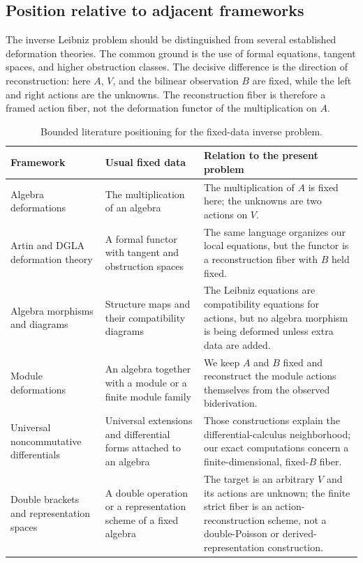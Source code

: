 \documentclass[11pt]{amsart}
\begin{document}
\subsection{Position relative to adjacent frameworks}\label{sec:literature-position}
The inverse Leibniz problem should be distinguished from several established deformation theories.  The common ground is the use of formal equations, tangent spaces, and higher obstruction classes.  The decisive difference is the direction of reconstruction: here $A$, $V$, and the bilinear observation $B$ are fixed, while the left and right actions are the unknowns.  The reconstruction fiber is therefore a framed action fiber, not the deformation functor of the multiplication on $A$.

\begin{table}[ht]
\centering
\small
\caption{Bounded literature positioning for the fixed-data inverse problem.}
\label{tab:framework-comparison}
\begin{tabular}{@{}p{}p{}p{}@{}}
\toprule
Framework & Usual fixed data & Relation to the present problem \\
\midrule
Algebra deformations \cite{Gerstenhaber1964} & The multiplication of an algebra & The multiplication of $A$ is fixed here; the unknowns are two actions on $V$. \\
Artin and DGLA deformation theory \cite{Schlessinger1968,GerstenhaberSchack1988} & A formal functor with tangent and obstruction spaces & The same language organizes our local equations, but the functor is a reconstruction fiber with $B$ held fixed. \\
Algebra morphisms and diagrams \cite{GerstenhaberSchack1983,GerstenhaberSchack1985} & Structure maps and their compatibility diagrams & The Leibniz equations are compatibility equations for actions, but no algebra morphism is being deformed unless extra data are added. \\
Module deformations \cite{Laudal2002} & An algebra together with a module or a finite module family & We keep $A$ and $B$ fixed and reconstruct the module actions themselves from the observed biderivation. \\
Universal noncommutative differentials \cite{CuntzQuillen1995} & Universal extensions and differential forms attached to an algebra & Those constructions explain the differential-calculus neighborhood; our exact computations concern a finite-dimensional, fixed-$B$ fiber. \\
Double brackets and representation spaces \cite{VanDenBergh2008,BerestKhachatryanRamadoss2013} & A double operation or a representation scheme of a fixed algebra & The target is an arbitrary $V$ and its actions are unknown; the finite strict fiber is an action-reconstruction scheme, not a double-Poisson or derived-representation construction. \\
\bottomrule
\end{tabular}
\end{table}
\end{document}
